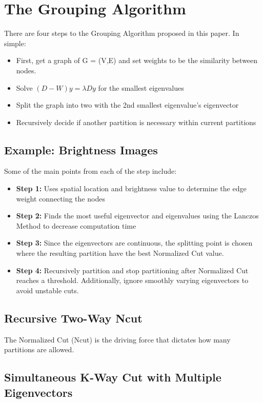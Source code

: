 \documentclass[letterpaper, 10 pt, conference]{ieeeconf}  %
\begin{document}
\section{The Grouping Algorithm}
There are four steps to the Grouping Algorithm proposed in this paper. In simple:
\begin{itemize}
\item First, get a graph of G = (V,E) and set weights to be the similarity between nodes.
\smallbreak
\item Solve $(D-W)y = \lambda Dy$ for the smallest eigenvalues
\smallbreak
\item Split the graph into two with the 2nd smallest eigenvalue's eigenvector
\smallbreak
\item Recursively decide if another partition is necessary within current partitions 
\end{itemize}

\subsection{Example: Brightness Images}
Some of the main points from each of the step include:
\begin{itemize}
\item \textbf{Step 1:} Uses spatial location and brightness value to determine the edge weight connecting the nodes
\smallbreak
\item \textbf{Step 2:} Finds the most useful eigenvector and eigenvalues using the Lanczos Method to decrease computation time
\item \textbf{Step 3:} Since the eigenvectors are continuous, the splitting point is chosen where the resulting partition have the best Normalized Cut value.
\item \textbf{Step 4:} Recursively partition and stop partitioning after Normalized Cut reaches a threshold. Additionally, ignore smoothly varying eigenvectors to avoid unstable cuts.
\end{itemize}

\subsection{Recursive Two-Way Ncut}
The Normalized Cut (Ncut) is the driving force that dictates how many partitions are allowed. 
\subsection{Simultaneous K-Way Cut with Multiple Eigenvectors}
\end{document}
